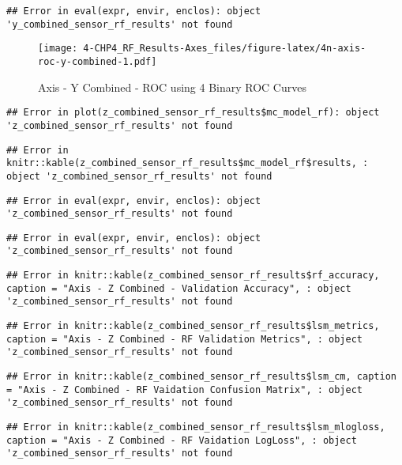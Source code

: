 \documentclass[]{article}
\begin{document}
\begin{verbatim}
## Error in eval(expr, envir, enclos): object 'y_combined_sensor_rf_results' not found
\end{verbatim}

\begin{figure}
\centering
\texttt{[image: 4-CHP4\_RF\_Results-Axes\_files/figure-latex/4n-axis-roc-y-combined-1.pdf]}
\caption{Axis - Y Combined - ROC using 4 Binary ROC Curves}
\end{figure}

\begin{verbatim}
## Error in plot(z_combined_sensor_rf_results$mc_model_rf): object 'z_combined_sensor_rf_results' not found
\end{verbatim}

\begin{verbatim}
## Error in knitr::kable(z_combined_sensor_rf_results$mc_model_rf$results, : object 'z_combined_sensor_rf_results' not found
\end{verbatim}

\begin{verbatim}
## Error in eval(expr, envir, enclos): object 'z_combined_sensor_rf_results' not found
\end{verbatim}

\begin{verbatim}
## Error in eval(expr, envir, enclos): object 'z_combined_sensor_rf_results' not found
\end{verbatim}

\begin{verbatim}
## Error in knitr::kable(z_combined_sensor_rf_results$rf_accuracy, caption = "Axis - Z Combined - Validation Accuracy", : object 'z_combined_sensor_rf_results' not found
\end{verbatim}

\begin{verbatim}
## Error in knitr::kable(z_combined_sensor_rf_results$lsm_metrics, caption = "Axis - Z Combined - RF Validation Metrics", : object 'z_combined_sensor_rf_results' not found
\end{verbatim}

\begin{verbatim}
## Error in knitr::kable(z_combined_sensor_rf_results$lsm_cm, caption = "Axis - Z Combined - RF Vaidation Confusion Matrix", : object 'z_combined_sensor_rf_results' not found
\end{verbatim}

\begin{verbatim}
## Error in knitr::kable(z_combined_sensor_rf_results$lsm_mlogloss, caption = "Axis - Z Combined - RF Vaidation LogLoss", : object 'z_combined_sensor_rf_results' not found
\end{verbatim}
\end{document}
